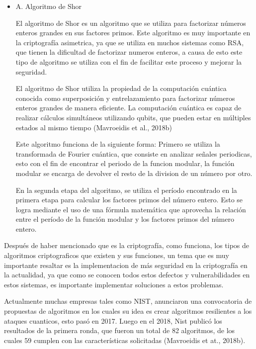 \documentclass{article}
\begin{document}
\begin{itemize}
    \item{A}. Algoritmo de Shor

        El algoritmo de Shor es un algoritmo que se utiliza para factorizar números enteros grandes en sus factores primos. Este algoritmo es muy importante en la criptografía asimetrica, ya que se utiliza en muchos sistemas como RSA, que tienen la dificultad de factorizar numeros enteros, a causa de esto este tipo de algoritmo se utiliza con el fin de facilitar este proceso y mejorar la seguridad.

        El algoritmo de Shor utiliza la propiedad de la computación cuántica conocida como superposición y entrelazamiento para factorizar números enteros grandes de manera eficiente. La computación cuántica es capaz de realizar cálculos simultáneos utilizando qubits, que pueden estar en múltiples estados al mismo tiempo (Mavroeidis et al., 2018b)

        Este algoritmo funciona de la siguiente forma: Primero se utiliza la transformada de Fourier cuántica, que consiste en analizar señales periodicas, esto con el fin de encontrar el periodo de la funcion modular, la función modular se encarga de devolver el resto de la division de un número por otro.

        En la segunda etapa del algoritmo, se utiliza el período encontrado en la primera etapa para calcular los factores primos del número entero. Esto se logra mediante el uso de una fórmula matemática que aprovecha la relación entre el período de la función modular y los factores primos del número entero.
\end{itemize}

Después de haber mencionado que es la criptografía, como funciona, los tipos de algoritmos criptograficos que existen y sus funciones, un tema que es muy importante resaltar es la implementacion de más seguridad en la criptografía en la actualidad, ya que como se conocen todos estos defectos y vulnerabilidades en estos sistemas, es importante implementar soluciones a estos problemas.

Actualmente muchas empresas tales como NIST, anunciaron una convocatoria de propuestas de algoritmos en los cuales su idea es crear algoritmos resilientes a los ataques cuanticos, esto pasó en 2017. Luego en el 2018, Nist publicó los resultados de la primera ronda, que fueron un total de 82 algoritmos, de los cuales 59 cumplen con las características solicitadas (Mavroeidis et at., 2018b).
\end{document}
